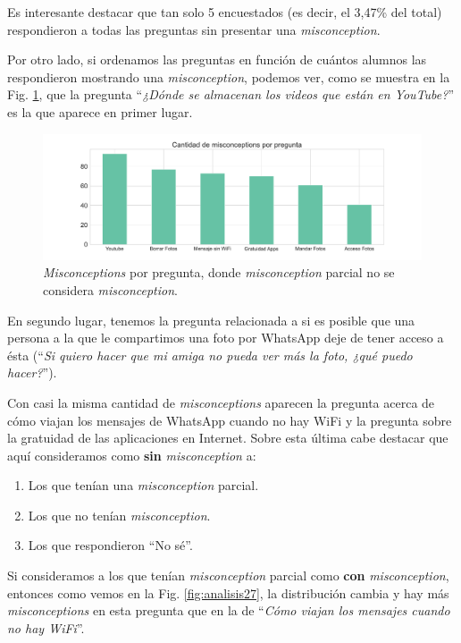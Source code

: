 Es interesante destacar que tan solo 5 encuestados (es decir, el 3,47\% del total) respondieron a todas las preguntas sin presentar una \textit{misconception}.

Por otro lado, si ordenamos las preguntas en función de cuántos alumnos las respondieron mostrando una \textit{misconception}, podemos ver, como se muestra en la Fig. \ref{fig:analisis26}, que la pregunta ``\textit{¿Dónde se almacenan los videos que están en YouTube?}'' es la que aparece en primer lugar.

\begin{figure}[h]
    \centering
    \includegraphics[width=1\textwidth]{images_analisis/26.pdf}
    \caption{\textit{Misconceptions} por pregunta, donde \textit{misconception} parcial no se considera \textit{misconception}.}
    \label{fig:analisis26}  
\end{figure}

\newpage

En segundo lugar, tenemos la pregunta relacionada a si es posible que una persona a la que le compartimos una foto por WhatsApp deje de tener acceso a ésta (``\textit{Si quiero hacer que mi amiga no pueda ver más la foto, ¿qué puedo hacer?}'').

Con casi la misma cantidad de \textit{misconceptions} aparecen la pregunta acerca de cómo viajan los mensajes de WhatsApp cuando no hay WiFi y la pregunta sobre la gratuidad de las aplicaciones en Internet. Sobre esta última cabe destacar que aquí consideramos como \textbf{sin} \textit{misconception} a:

\begin{enumerate}
    \item Los que tenían una \textit{misconception} parcial.
    \item Los que no tenían \textit{misconception}.
    \item Los que respondieron “No sé”.
\end{enumerate}

Si consideramos a los que tenían \textit{misconception} parcial como \textbf{con} \textit{misconception}, entonces como vemos en la Fig. \ref{fig:analisis27}, la distribución cambia y hay más \textit{misconceptions} en esta pregunta que en la de ``\textit{Cómo viajan los mensajes cuando no hay WiFi}''.

